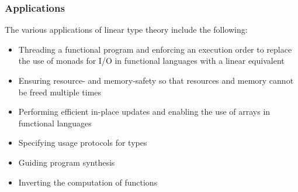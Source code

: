\subsubsection{Applications}
The various applications of linear type theory include the following:
\begin{itemize}
	\item Threading a functional program and enforcing an execution order to replace the use of monads for I/O in functional languages with a linear equivalent \citep{de_vries_making_2009} \citep{bernardy_linear_2018} \citep{brady_idris_2021}
	\item Ensuring resource- and memory-safety so that resources and memory cannot be freed multiple times \citep{weiss_oxide_2021}
	\item Performing efficient in-place updates and enabling the use of arrays in functional languages \citep{de_vries_making_2009} \citep{bernardy_linear_2018}
	\item Specifying usage protocols for types \citep{brady_idris_2021}
	\item Guiding program synthesis \citep{brady_idris_2021}
	\item Inverting the computation of functions \citep{matsuda_sparcl_2020}
\end{itemize}
\clearpage
{}
\vspace*{\fill}
